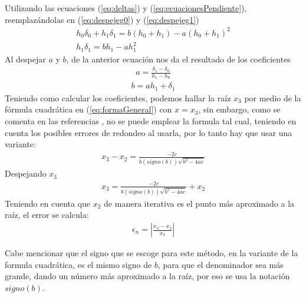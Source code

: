 \documentclass[ceqn,10pt]{SelfArx}
\begin{document}
Utilizando las ecuaciones (\ref*{eq:deltas}) y
(\ref*{eq:ecuacionesPendiente}), reemplazándolas en (\ref*{eq:despejeg0}) y
(\ref*{eq:despejeg1})
\begin{equation} \label{eq:reemp}
	\begin{aligned}
	 h_{0}\delta_{0}+h_{1}\delta_{1} = b(h_{0}+h_{1})-a(h_{0}+h_{1})^2\\
	 h_{1}\delta_{1} = b h_{1} - ah_{1}^2 
\end{aligned}
\end{equation}
Al despejar $a$ y $b$, de la anterior ecuación nos da el resultado de los coeficientes
\begin{equation} \label{eq:coeficienteA}
	\begin{aligned}
	a = \frac{\delta_{1}-\delta_{0}}{h_{1}-h_{0}}
\end{aligned}
\end{equation}
\begin{equation} \label{eq:coeficienteB}
	\begin{aligned}
	b = a h_{1} + \delta_{1}
\end{aligned}
\end{equation}
Teniendo como calcular los coeficientes, podemos hallar la raíz $x_{3}$ por
medio de la fórmula cuadrática en (\ref*{eq:formaGeneral}) con $x = x_{3}$,
sin embargo, como se comenta en las referencias
\cite{burden2017, chapra2011}, no se puede emplear la formula tal cual, teniendo en cuenta
los posibles errores de redondeo al usarla, por lo tanto hay que usar una
variante:
\begin{equation} \label{eq:x3}
	\begin{aligned}
	x_{3}-x_{2}=\frac{-2c}{b (signo(b))\sqrt{b^2-4ac}}
\end{aligned}
\end{equation}
Despejando $x_{3}$
\begin{equation} \label{eq:x3Solv2}
	\begin{aligned}
	x_{3}=\frac{-2c}{b(signo(b))\sqrt{b^2-4ac}}+x_{2}
\end{aligned}
\end{equation}
Teniendo en cuenta que $x_{2}$ de manera iterativa es el punto más
aproximado a la raíz, el error se calcula:
\begin{equation} \label{eq:error}
	\begin{aligned}
	\epsilon_{n}= |\frac{x_{3}-x_{2}}{x_{3}}|
\end{aligned}
\end{equation}

Cabe mencionar que el signo que se escoge para este método, en la variante
de la formula cuadrática, es el mismo signo de $b$, para que el denominador
sea más grande, dando un número más aproximado a la raíz, por eso se usa la
notación $signo(b)$.
\end{document}
